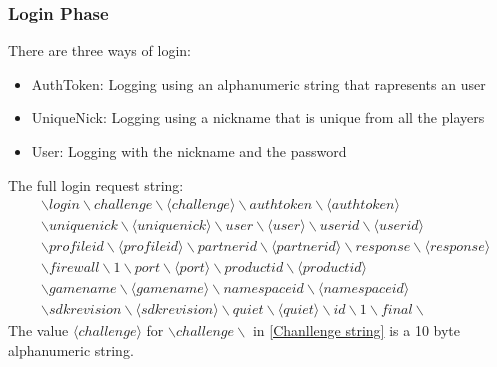 \documentclass[oneside,titlepage,a4paper]{Definition/retrospy} %
\begin{document}
\subsubsection{Login Phase}
There are three ways of login:
\begin{itemize}
	\item AuthToken: Logging using an alphanumeric string that rapresents an user
	\item 	UniqueNick: Logging using a nickname that is unique from all the players
	\item User: Logging with the nickname and the password
\end{itemize}

The full login request string:
\begin{equation}\label{Chanllenge string}
\begin{split}
	&\backslash login \backslash challenge \backslash \langle challenge \rangle \backslash authtoken \backslash \langle authtoken \rangle \\& \backslash uniquenick \backslash \langle uniquenick \rangle \backslash user \backslash \langle user \rangle 
	\backslash userid \backslash \langle userid \rangle \\& \backslash profileid \backslash \langle profileid \rangle \backslash partnerid \backslash \langle partnerid \rangle \backslash response \backslash \langle response \rangle \\&
	 \backslash firewall \backslash 1 \backslash port \backslash \langle port \rangle \backslash productid \backslash  \langle productid \rangle \\& \backslash gamename \backslash \langle gamename \rangle \backslash namespaceid \backslash \langle namespaceid \rangle \\& \backslash  sdkrevision \backslash \langle sdkrevision \rangle \backslash quiet \backslash \langle quiet \rangle \backslash id \backslash 1 \backslash final \backslash
\end{split}
\end{equation}
The value $ \langle challenge \rangle $ for $ \backslash challenge \backslash $ in \ref{Chanllenge string} is a 10 byte alphanumeric string.
\end{document}
